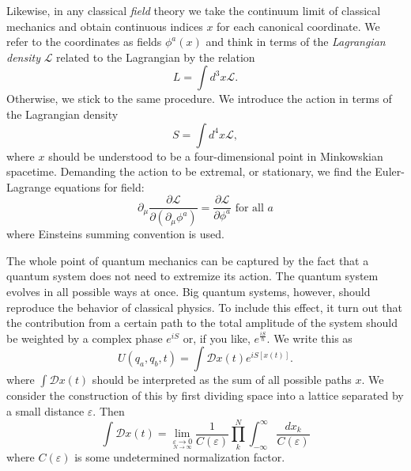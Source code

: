 \documentclass[twoside,utf8]{article}
\begin{document}
Likewise, in any classical {\it field} theory we take the continuum limit of classical mechanics and obtain continuous indices $x$ for each canonical coordinate. We refer to the coordinates as fields $\phi^a(x)$ and think in terms of the {\it Lagrangian density} $\mathcal{L}$ related to the Lagrangian by the relation
\[
L = \int d^3 x \mathcal{L}.
\]
Otherwise, we stick to the same procedure. We introduce the action in terms of the Lagrangian density
\[
S = \int d^4 x \mathcal{L},
\]
where $x$ should be understood to be a four-dimensional point in Minkowskian spacetime. Demanding the action to be extremal, or stationary, we find the Euler-Lagrange equations for field:
\[
\partial_\mu \frac{\partial \mathcal{L}}{\partial (\partial_\mu \phi^a)}=\frac{\partial \mathcal{L}}{\partial \phi^a} \text{ for all } a
\]
where Einsteins summing convention is used.

The whole point of quantum mechanics can be captured by the fact that a quantum system does not need to extremize its action. The quantum system evolves in all possible ways at once. Big quantum systems, however, should reproduce the behavior of classical physics. To include this effect, it turn out that the contribution from a certain path to the total amplitude of the system should be weighted by a complex phase $e^{iS}$ or, if you like, $e^{\frac{iS}{\hbar}}$. We write this as
\[
U(q_a,q_b,t) = \int \mathcal{D}x(t) e^{iS[x(t)]}.
\]
where $\int \mathcal{D}x(t)$ should be interpreted as the sum of all possible paths $x$. We consider the construction of this by first dividing space into a lattice separated by a small distance $\varepsilon$. Then
\[
\int \mathcal{D}x(t)
= \lim_{\underset{N\rightarrow \infty}{\varepsilon \rightarrow 0}} \frac{1}{C(\varepsilon)} \prod_k^N \int_{-\infty}^\infty \frac{dx_k}{C(\varepsilon)}
\]
where $C(\varepsilon)$ is some undetermined normalization factor.
\end{document}
